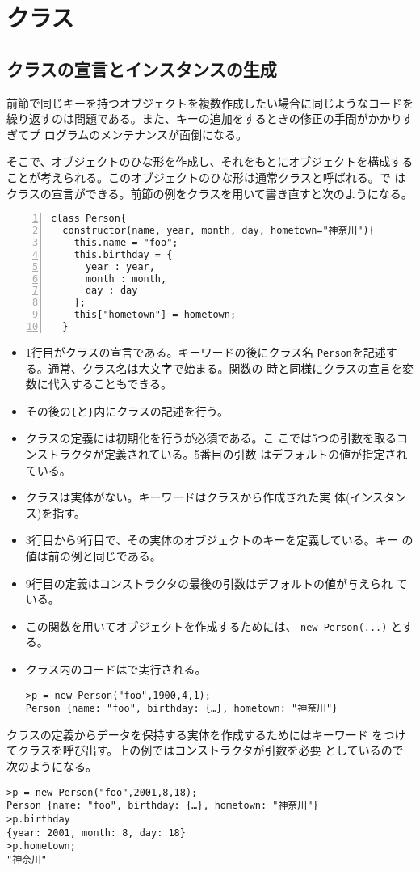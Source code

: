 
 \section{クラス}
 \subsection{クラスの宣言とインスタンスの生成}
前節で同じキーを持つオブジェクトを複数作成したい場合に同じようなコードを
繰り返すのは問題である。また、キーの追加をするときの修正の手間がかかりすぎてプ
ログラムのメンテナンスが面倒になる。

そこで、オブジェクトのひな形を作成し、それをもとにオブジェクトを構成する
ことが考えられる。このオブジェクトのひな形は通常クラスと呼ばれる。\ES で
はクラスの宣言ができる。前節の例をクラスを用いて書き直すと次のようになる。
\begin{Verbatim}[numbers=left]
class Person{
  constructor(name, year, month, day, hometown="神奈川"){
    this.name = "foo";
    this.birthday = {
      year : year,
      month : month,
      day : day
    };
    this["hometown"] = hometown;
  }
\end{Verbatim}
\begin{itemize}
 \item 1行目がクラスの宣言である。キーワードの後にクラス名
       \texttt{Person}を記述する。通常、クラス名は大文字で始まる。関数の
       時と同様にクラスの宣言を変数に代入することもできる。
 \item その後の\Verb+{+と\Verb+}+内にクラスの記述を行う。
 \item クラスの定義には初期化を行うが必須である。こ
       こでは5つの引数を取るコンストラクタが定義されている。5番目の引数
       はデフォルトの値が指定されている。
 \item クラスは実体がない。キーワードはクラスから作成された実
       体(インスタンス)を指す。
 \item 3行目から9行目で、その実体のオブジェクトのキーを定義している。キー
			 の値は前の例と同じである。
 \item 9行目の定義はコンストラクタの最後の引数はデフォルトの値が与えられ
			 ている。
 \item この関数を用いてオブジェクトを作成するためには、
       \verb+new Person(...)+ とする。
 \item クラス内のコードは\Strict で実行される。
\begin{Verbatim}
>p = new Person("foo",1900,4,1);
Person {name: "foo", birthday: {…}, hometown: "神奈川"}
\end{Verbatim}
\end{itemize}
クラスの定義からデータを保持する実体を作成するためにはキーワード
をつけてクラスを呼び出す。上の例ではコンストラクタが引数を必要
としているので次のようになる。
\begin{Verbatim}
>p = new Person("foo",2001,8,18);
Person {name: "foo", birthday: {…}, hometown: "神奈川"}
>p.birthday
{year: 2001, month: 8, day: 18}
>p.hometown;
"神奈川"
\end{Verbatim}
